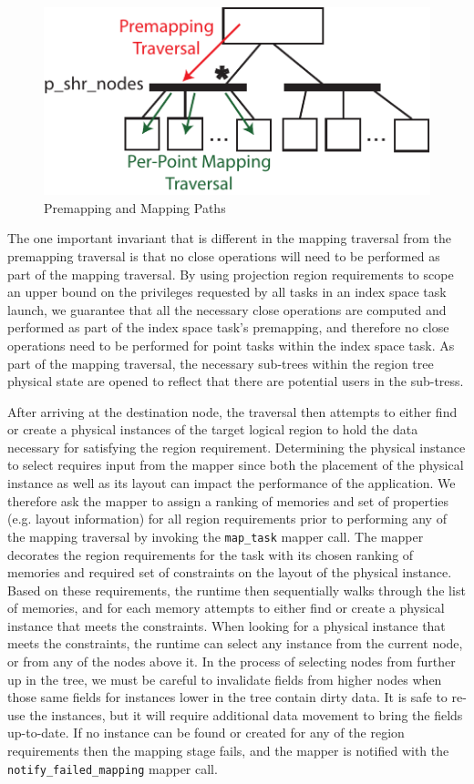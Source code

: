 \begin{figure}[t]
\centering
\includegraphics[scale=0.9]{figs/PremappingTraversal.pdf}
\caption{Premapping and Mapping Paths\label{fig:mapaths}}
\end{figure}

The one important invariant that is different in
the mapping traversal from the premapping
traversal is that no close operations will
need to be performed as part of the mapping
traversal.  By using projection region requirements
to scope an upper bound on the privileges
requested by all tasks in an index space
task launch, we guarantee that all the necessary
close operations are computed and performed
as part of the index space task's premapping,
and therefore no close operations need to
be performed for point tasks within the 
index space task. As part of the mapping
traversal, the necessary sub-trees within
the region tree physical state are opened
to reflect that there are potential users
in the sub-tress.

After arriving at the destination node, 
the traversal then attempts to either find or
create a physical instances of the target
logical region to hold the data necessary
for satisfying the region requirement.
Determining the physical instance to select
requires input from the mapper since both
the placement of the physical instance as
well as its layout can impact the performance
of the application. We therefore ask the
mapper to assign a ranking of memories and
set of properties (e.g. layout information)
for all region requirements prior to performing
any of the mapping traversal by invoking
the {\tt map\_task} mapper call. The mapper
decorates the region requirements for the
task with its chosen ranking of memories and
required set of constraints on the layout
of the physical instance. Based on these
requirements, the runtime then sequentially
walks through the list of memories, and for
each memory attempts to either find or 
create a physical instance that meets the
constraints. When looking for a physical
instance that meets the constraints, the
runtime can select any instance from the
current node, or from any of the nodes above
it.  In the process of selecting nodes
from further up in the tree, we must be careful 
to invalidate fields from higher nodes
when those same fields for instances lower
in the tree contain dirty data. It is safe
to re-use the instances, but it will require
additional data movement to bring the fields
up-to-date. If no instance can be found or 
created for any of the region requirements 
then the mapping stage fails, and the mapper
is notified with the {\tt notify\_failed\_mapping}
mapper call. 

